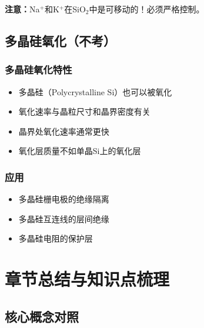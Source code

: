 \documentclass[UTF8,12pt,a4paper]{ctexart}
\begin{document}
\textbf{注意：}Na$^+$和K$^+$在SiO$_2$中是可移动的！必须严格控制。

\subsection{多晶硅氧化（不考）}

\subsubsection{多晶硅氧化特性}

\begin{itemize}
    \item 多晶硅（Polycrystalline Si）也可以被氧化
    \item 氧化速率与晶粒尺寸和晶界密度有关
    \item 晶界处氧化速率通常更快
    \item 氧化层质量不如单晶Si上的氧化层
\end{itemize}

\subsubsection{应用}

\begin{itemize}
    \item 多晶硅栅电极的绝缘隔离
    \item 多晶硅互连线的层间绝缘
    \item 多晶硅电阻的保护层
\end{itemize}
\newpage
\section{章节总结与知识点梳理}

\subsection{核心概念对照}
\end{document}
